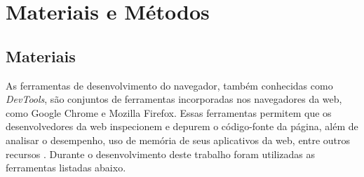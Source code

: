 
\chapter{Materiais e Métodos}
\label{cap:materialemetodos}


%
\section{Materiais}\label{sec:materiais}
%
%
%

As ferramentas de desenvolvimento do navegador, também conhecidas como \textit{DevTools}, são conjuntos de ferramentas incorporadas nos navegadores da web, como Google Chrome e Mozilla Firefox. Essas ferramentas permitem que os desenvolvedores da web inspecionem e depurem o código-fonte da página, além de analisar o desempenho, uso de memória de seus aplicativos da web, entre outros recursos \cite{apple}. Durante o desenvolvimento deste trabalho foram utilizadas as ferramentas listadas abaixo.

